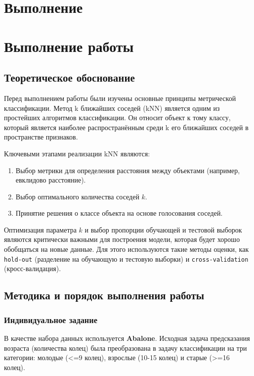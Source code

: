 \chapter{Выполнение}
\label{ch:chapter 1}

\chapter{Выполнение работы}

\section{Теоретическое обоснование}

Перед выполнением работы были изучены основные принципы метрической классификации. Метод k ближайших соседей (kNN) является одним из простейших алгоритмов классификации. Он относит объект к тому классу, который является наиболее распространённым среди k его ближайших соседей в пространстве признаков.

Ключевыми этапами реализации kNN являются:
\begin{enumerate}
    \item Выбор метрики для определения расстояния между объектами (например, евклидово расстояние).
    \item Выбор оптимального количества соседей $k$.
    \item Принятие решения о классе объекта на основе голосования соседей.
\end{enumerate}

Оптимизация параметра $k$ и выбор пропорции обучающей и тестовой выборок являются критически важными для построения модели, которая будет хорошо обобщаться на новые данные. Для этого используются такие методы оценки, как \texttt{hold-out} (разделение на обучающую и тестовую выборки) и \texttt{cross-validation} (кросс-валидация).

\section{Методика и порядок выполнения работы}

\subsection{Индивидуальное задание}
В качестве набора данных используется \textbf{Abalone}. Исходная задача предсказания возраста (количества колец) была преобразована в задачу классификации на три категории: молодые (<=9 колец), взрослые (10-15 колец) и старые (>=16 колец).

